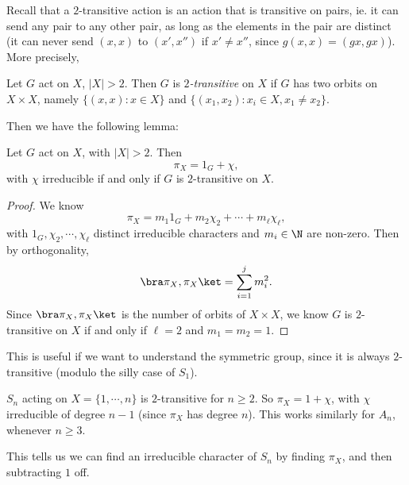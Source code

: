 \documentclass[a4paper]{article}
\begin{document}
Recall that a $2$-transitive action is an action that is transitive on pairs, ie. it can send any pair to any other pair, as long as the elements in the pair are distinct (it can never send $(x, x)$ to $(x', x'')$ if $x' \not= x''$, since $g(x, x) = (gx, gx)$). More precisely,
\begin{defi}[$2$-transitive]
  Let $G$ act on $X$, $|X| > 2$. Then $G$ is \emph{$2$-transitive} on $X$ if $G$ has two orbits on $X \times X$, namely $\{(x, x): x \in X\}$ and $\{(x_1, x_2): x_i \in X, x_1 \not= x_2\}$.
\end{defi}
Then we have the following lemma:

\begin{lemma}
  Let $G$ act on $X$, with $|X| > 2$. Then
  \[
    \pi_X = 1_G + \chi,
  \]
  with $\chi$ irreducible if and only if $G$ is $2$-transitive on $X$.
\end{lemma}

\begin{proof}
  We know
  \[
    \pi_X = m_1 1_G + m_2 \chi_2 + \cdots + m_\ell \chi_\ell,
  \]
  with $1_G, \chi_2, \cdots, \chi_\ell$ distinct irreducible characters and $m_i \in \N$ are non-zero. Then by orthogonality,
  \[
    \bra \pi_X, \pi_X\ket = \sum_{i = 1}^j m_i^2.
  \]
  Since $\bra \pi_X, \pi_X\ket$ is the number of orbits of $X \times X$, we know $G$ is $2$-transitive on $X$ if and only if $\ell = 2$ and $m_1 = m_2 = 1$.
\end{proof}

This is useful if we want to understand the symmetric group, since it is always $2$-transitive (modulo the silly case of $S_1$).
\begin{eg}
  $S_n$ acting on $X = \{1, \cdots, n\}$ is $2$-transitive for $n \geq 2$. So $\pi_X = 1 + \chi$, with $\chi$ irreducible of degree $n - 1$ (since $\pi_X$ has degree $n$). This works similarly for $A_n$, whenever $n \geq 3$.
\end{eg}
This tells us we can find an irreducible character of $S_n$ by finding $\pi_X$, and then subtracting $1$ off.
\end{document}
